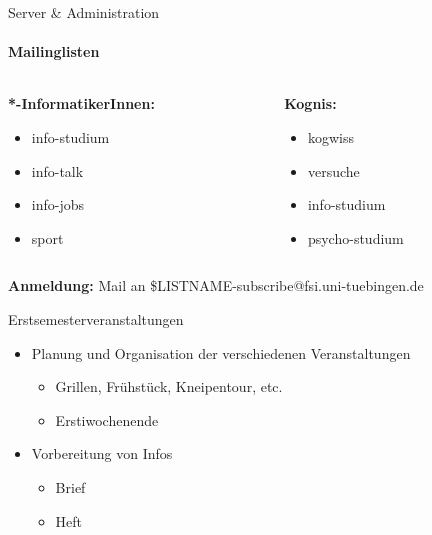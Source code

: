 \documentclass{beamer}
\begin{document}
	\begin{frame}{Server \& Administration}
	\framesubtitle{Mailinglisten}
		\begin{columns}
			\begin{column}{.5\textwidth}
				\textbf{*-InformatikerInnen:}
				\small
				\begin{itemize}
					\item info-studium 
					\item info-talk
					\item info-jobs
					\item sport
				\end{itemize}
			\end{column}
			\begin{column}{.5\textwidth}
				\textbf{Kognis:}\\
				\small
				\begin{itemize}
					\item kogwiss 
					\item versuche
					\item info-studium
					\item psycho-studium
				\end{itemize}

			\end{column}
		\end{columns}
		\vfill
		\textbf{Anmeldung:} Mail an \$LISTNAME-subscribe@fsi.uni-tuebingen.de
	
	\end{frame}
	
	\begin{frame}{Erstsemesterveranstaltungen}
		\begin{itemize}
			\item Planung und Organisation der verschiedenen Veranstaltungen
			\begin{itemize}
				\item Grillen, Frühstück, Kneipentour, etc.
				\item Erstiwochenende
			\end{itemize}
			\item Vorbereitung von Infos
			\begin{itemize}
				\item Brief
				\item Heft
			\end{itemize}
		\end{itemize}
	\end{frame}
			
\end{document}
